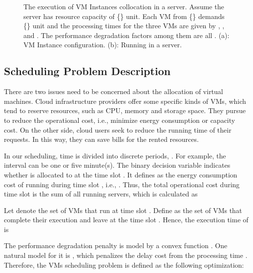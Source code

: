 \documentclass[10pt,journal]{IEEEtran}
\begin{document}
\begin{figure}
\caption{\label{fig:example_degradationFactor}The execution of VM Instances collocation in a server. Assume the server has resource capacity of \{\} unit. Each VM from \{\} demands \{\} unit and the processing times for the three VMs are given by , , and . The performance degradation factors among them are all . (a): VM Instance configuration. (b): Running in a server.}
\end{figure}

\subsection{Scheduling Problem Description}

There are two issues need to be concerned about the allocation of virtual machines. Cloud infrastructure providers offer some specific kinds of VMs, which tend to reserve resources, such as CPU, memory and storage space. They pursue to reduce the operational cost, i.e., minimize energy consumption or capacity cost. On the other side, cloud users seek to reduce the running time of their requests. In this way, they can save bills for the rented resources.

In our scheduling, time is divided into discrete periods, . For example, the interval  can be one or five minute(s). The binary decision variable  indicates whether  is allocated to  at the time slot . It defines  as the energy consumption cost of  running during time slot , i.e., . Thus, the total operational cost during time slot  is the sum of all running servers, which is calculated as


Let  denote the set of VMs that run at time slot . Define  as the set of VMs that complete their execution and leave at the time slot . Hence, the execution time  of   is


The performance degradation penalty is model by a convex function . One natural model for it is  , which penalizes the delay cost from the processing time . Therefore, the VMs scheduling problem is defined as the following optimization:
\end{document}
